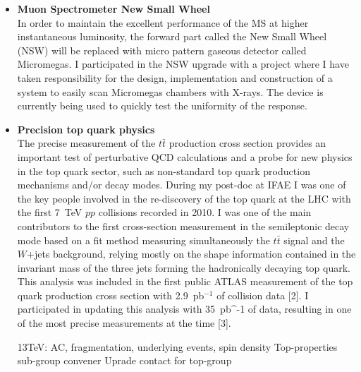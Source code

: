 \documentclass[12pt]{article}
\begin{document}
\begin{itemize}[leftmargin=1.3cm]
\item[] {\bf Muon Spectrometer New Small Wheel}\\
In order to maintain the excellent performance of the MS at higher instantaneous luminosity, the forward part called the New Small Wheel (NSW)
will be replaced with micro pattern gaseous detector called Micromegas.
I participated in the NSW upgrade with a project where I have taken responsibility for the design, implementation and construction of a system to easily scan Micromegas 
chambers with X-rays. The device is currently being used to quickly test the uniformity of the response.

\vspace{2.5mm}


\item[] {\bf Precision top quark physics}\\

The precise measurement of the $t\bar{t}$ production cross section provides an important test of perturbative 
QCD calculations and a probe for new physics in the top quark sector, such as non-standard top quark 
production mechanisms and/or decay modes. 
During my post-doc at IFAE I was one of the key people involved in the re-discovery of the top quark at the LHC with the first 7~TeV $pp$ collisions recorded in 2010. I was one of the main contributors to the first cross-section measurement in the 
semileptonic decay mode based on a fit method measuring simultaneously the $t\bar{t}$ signal and the $W$+jets background,
relying mostly 
on the shape information contained in the invariant mass of the three jets forming the hadronically decaying top quark. 
This analysis was included in the first public ATLAS measurement of the top quark production cross section with 2.9~pb$^{-1}$ of collision data [2].
I participated in updating this analysis with 35~pb^{-1} of data, resulting in one of the most precise measurements at the time [3].

13TeV: AC, fragmentation, underlying events, spin density
Top-properties sub-group convener
Uprade contact for top-group

\vspace{2.5mm}


\end{itemize}
\end{document}
